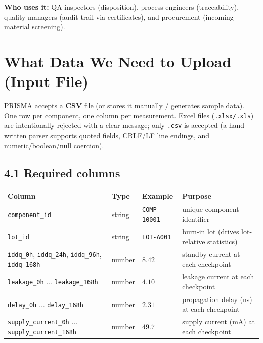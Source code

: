 \documentclass[11pt,a4paper]{article}
\newcommand{\code}[1]{\texttt{\small #1}}
\newcommand{\answerbox}[2]{\par\vspace{0.8em}\noindent
  \begin{tcolorbox}[colback=isroblue!6,colframe=isroblue,
    title={\sffamily\bfseries\color{white}#1},arc=2pt,boxrule=1.2pt]
    #2
  \end{tcolorbox}\par\vspace{0.4em}}
\begin{document}
\noindent \textbf{Who uses it:} QA inspectors (disposition), process engineers (traceability),
quality managers (audit trail via certificates), and procurement (incoming material screening).

\section{What Data We Need to Upload (Input File)}

\answerbox{Input file format and required columns}{
  PRISMA accepts a \textbf{CSV} file (or stores it manually / generates sample data). One row per
  component, one column per measurement. Excel files (\code{.xlsx/.xls}) are intentionally rejected
  with a clear message; only \code{.csv} is accepted (a hand-written parser supports quoted fields,
  CRLF/LF line endings, and numeric/boolean/null coercion).
}

\subsection*{4.1 Required columns}
\begin{center}
\begin{tabular}{@{}llll@{}}
\toprule
\textbf{Column} & \textbf{Type} & \textbf{Example} & \textbf{Purpose}\\
\midrule
\code{component\_id} & string & \code{COMP-10001} & unique component identifier\\
\code{lot\_id} & string & \code{LOT-A001} & burn-in lot (drives lot-relative statistics)\\
\code{iddq\_0h}, \code{iddq\_24h}, \code{iddq\_96h}, \code{iddq\_168h} & number & $8.42$ & standby current at each checkpoint\\
\code{leakage\_0h} $\dots$ \code{leakage\_168h} & number & $4.10$ & leakage current at each checkpoint\\
\code{delay\_0h} $\dots$ \code{delay\_168h} & number & $2.31$ & propagation delay (ns) at each checkpoint\\
\code{supply\_current\_0h} $\dots$ \code{supply\_current\_168h} & number & $49.7$ & supply current (mA) at each checkpoint\\
\bottomrule
\end{tabular}
\end{center}
\end{document}
